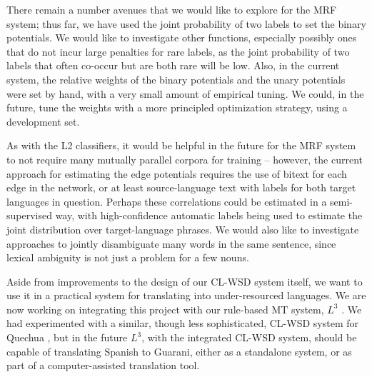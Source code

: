 \documentclass[11pt,letterpaper]{article}
\begin{document}
There remain a number avenues that we would like to explore for the MRF system;
thus far, we have used the joint probability of two labels to set the binary
potentials. We would like to investigate other functions, especially possibly
ones that do not incur large penalties for rare labels, as the joint
probability of two labels that often co-occur but are both rare will be low.
Also, in the current system, the relative weights of the binary potentials and
the unary potentials were set by hand, with a very small amount of empirical
tuning. We could, in the future, tune the weights with a more principled
optimization strategy, using a development set.

As with the L2 classifiers, it would be helpful in the future for the MRF
system to not require many mutually parallel corpora for training -- however,
the current approach for estimating the edge potentials requires the use of
bitext for each edge in the network, or at least source-language text with
labels for both target languages in question. Perhaps these correlations could
be estimated in a semi-supervised way, with high-confidence automatic labels
being used to estimate the joint distribution over target-language phrases.  We
would also like to investigate approaches to jointly disambiguate many words in
the same sentence, since lexical ambiguity is not just a problem for a few
nouns.

Aside from improvements to the design of our CL-WSD system itself, we want to
use it in a practical system for translating into under-resourced languages.
We are now working on integrating this project with our rule-based MT system,
$L^3$ \cite{gasser:aflat2012}. We had experimented with a similar, though less
sophisticated, CL-WSD system for Quechua \cite{rudnick:2011:RANLPStud}, but in
the future $L^3$, with the integrated CL-WSD system, should be capable of
translating Spanish to Guarani, either as a standalone system, or as part of a
computer-assisted translation tool.



{}
\end{document}

